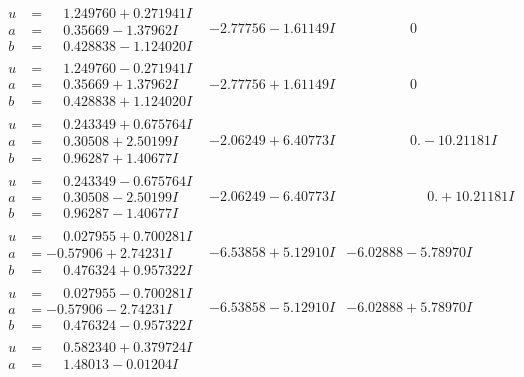 \documentclass[1p]{elsarticle_modified}
\theoremstyle{definition}
\begin{document}
$$\begin{array}{c|c|c}
 \hline 
\begin{aligned}
u &= \phantom{-}1.249760 + 0.271941 I \\
a &= \phantom{-}0.35669 - 1.37962 I \\
b &= \phantom{-}0.428838 - 1.124020 I\end{aligned}
 & -2.77756 - 1.61149 I & \phantom{-0.000000 } 0 \\ \hline\begin{aligned}
u &= \phantom{-}1.249760 - 0.271941 I \\
a &= \phantom{-}0.35669 + 1.37962 I \\
b &= \phantom{-}0.428838 + 1.124020 I\end{aligned}
 & -2.77756 + 1.61149 I & \phantom{-0.000000 } 0 \\ \hline\begin{aligned}
u &= \phantom{-}0.243349 + 0.675764 I \\
a &= \phantom{-}0.30508 + 2.50199 I \\
b &= \phantom{-}0.96287 + 1.40677 I\end{aligned}
 & -2.06249 + 6.40773 I & \phantom{-0.000000 } 0. - 10.21181 I \\ \hline\begin{aligned}
u &= \phantom{-}0.243349 - 0.675764 I \\
a &= \phantom{-}0.30508 - 2.50199 I \\
b &= \phantom{-}0.96287 - 1.40677 I\end{aligned}
 & -2.06249 - 6.40773 I & \phantom{-0.000000 -}0. + 10.21181 I \\ \hline\begin{aligned}
u &= \phantom{-}0.027955 + 0.700281 I \\
a &= -0.57906 + 2.74231 I \\
b &= \phantom{-}0.476324 + 0.957322 I\end{aligned}
 & -6.53858 + 5.12910 I & -6.02888 - 5.78970 I \\ \hline\begin{aligned}
u &= \phantom{-}0.027955 - 0.700281 I \\
a &= -0.57906 - 2.74231 I \\
b &= \phantom{-}0.476324 - 0.957322 I\end{aligned}
 & -6.53858 - 5.12910 I & -6.02888 + 5.78970 I \\ \hline\begin{aligned}
u &= \phantom{-}0.582340 + 0.379724 I \\
a &= \phantom{-}1.48013 - 0.01204 I \\

\end{aligned}
\end{array}$$
\end{document}
